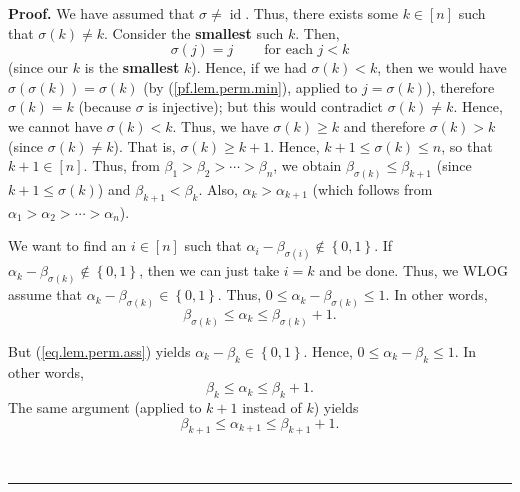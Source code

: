 \documentclass[numbers=enddot,12pt,final,onecolumn,notitlepage]{scrartcl}%
\numberwithin{exer}{section}
\theoremstyle{definition}
\newenvironment{proof}[1][Proof]{\noindent\textbf{#1.} }{\ \rule{0.5em}{0.5em}}
\theoremstyle{plainsl}
\begin{document}
\begin{proof}
We have assumed that $\sigma\neq\operatorname*{id}$. Thus, there exists some
$k\in\left[  n\right]  $ such that $\sigma\left(  k\right)  \neq k$. Consider
the \textbf{smallest} such $k$. Then,%
\begin{equation}
\sigma\left(  j\right)  =j\ \ \ \ \ \ \ \ \ \ \text{for each }j<k
\label{pf.lem.perm.min}%
\end{equation}
(since our $k$ is the \textbf{smallest} $k$). Hence, if we had $\sigma\left(
k\right)  <k$, then we would have $\sigma\left(  \sigma\left(  k\right)
\right)  =\sigma\left(  k\right)  $ (by (\ref{pf.lem.perm.min}), applied to
$j=\sigma\left(  k\right)  $), therefore $\sigma\left(  k\right)  =k$ (because
$\sigma$ is injective); but this would contradict $\sigma\left(  k\right)
\neq k$. Hence, we cannot have $\sigma\left(  k\right)  <k$. Thus, we have
$\sigma\left(  k\right)  \geq k$ and therefore $\sigma\left(  k\right)  >k$
(since $\sigma\left(  k\right)  \neq k$). That is, $\sigma\left(  k\right)
\geq k+1$. Hence, $k+1\leq\sigma\left(  k\right)  \leq n$, so that
$k+1\in\left[  n\right]  $. Thus, from $\beta_{1}>\beta_{2}>\cdots>\beta_{n}$,
we obtain $\beta_{\sigma\left(  k\right)  }\leq\beta_{k+1}$ (since
$k+1\leq\sigma\left(  k\right)  $) and $\beta_{k+1}<\beta_{k}$. Also,
$\alpha_{k}>\alpha_{k+1}$ (which follows from $\alpha_{1}>\alpha_{2}%
>\cdots>\alpha_{n}$).

We want to find an $i\in\left[  n\right]  $ such that $\alpha_{i}%
-\beta_{\sigma\left(  i\right)  }\notin\left\{  0,1\right\}  $. If $\alpha
_{k}-\beta_{\sigma\left(  k\right)  }\notin\left\{  0,1\right\}  $, then we
can just take $i=k$ and be done. Thus, we WLOG assume that $\alpha_{k}%
-\beta_{\sigma\left(  k\right)  }\in\left\{  0,1\right\}  $. Thus,
$0\leq\alpha_{k}-\beta_{\sigma\left(  k\right)  }\leq1$. In other words,
\begin{equation}
\beta_{\sigma\left(  k\right)  }\leq\alpha_{k}\leq\beta_{\sigma\left(
k\right)  }+1. \label{pf.lem.perm.4}%
\end{equation}


But (\ref{eq.lem.perm.ass}) yields $\alpha_{k}-\beta_{k}\in\left\{
0,1\right\}  $. Hence, $0\leq\alpha_{k}-\beta_{k}\leq1$. In other words,
\[
\beta_{k}\leq\alpha_{k}\leq\beta_{k}+1.
\]
The same argument (applied to $k+1$ instead of $k$) yields%
\[
\beta_{k+1}\leq\alpha_{k+1}\leq\beta_{k+1}+1.
\]



\end{proof}
\end{document}
